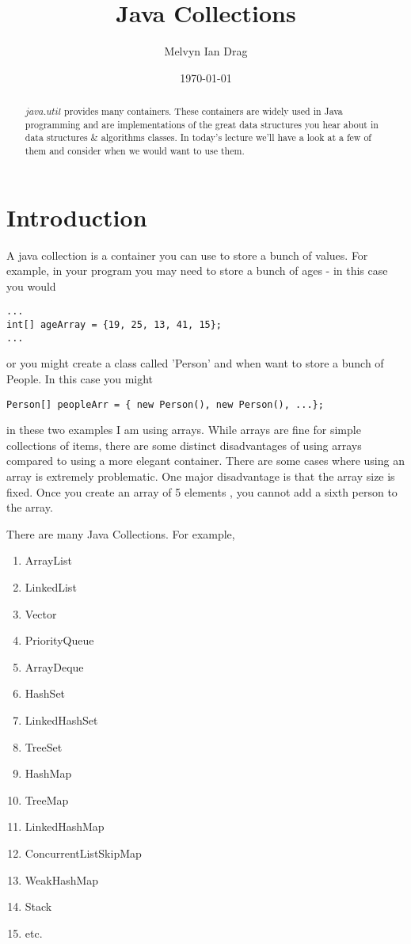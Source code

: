 \documentclass[12pt]{article}
\title{Java Collections}
\author{
	Melvyn Ian Drag
}
\date{\today}
\begin{document}
\maketitle

\begin{abstract}
$java.util$ provides many containers. These containers are widely used in Java programming and are implementations of the great data structures you hear about in data structures \& algorithms classes. In today's lecture we'll have a look at a few of them and consider when we would want to use them.
\end{abstract}

\section{Introduction}
A java collection is a container you can use to store a bunch of values. For example, in your program you may need to store a bunch of ages - in this case you would

\begin{lstlisting}
...
int[] ageArray = {19, 25, 13, 41, 15};
...
\end{lstlisting} 

or you might create a class called 'Person' and when want to store a bunch of People. In this case you might

\begin{lstlisting}
Person[] peopleArr = { new Person(), new Person(), ...};
\end{lstlisting}

in these two examples I am using arrays. While arrays are fine for simple collections of items, there are some distinct disadvantages of using arrays compared to using a more elegant container. There are some cases where using an array is extremely problematic. One major disadvantage is that the array size is fixed. Once you create an array of 5  elements , you cannot add a sixth person to the array.  

There are many Java Collections. For example, 

\begin{enumerate}
\item ArrayList
\item LinkedList
\item Vector
\item PriorityQueue
\item ArrayDeque
\item HashSet
\item LinkedHashSet
\item TreeSet
\item HashMap
\item TreeMap
\item LinkedHashMap
\item ConcurrentListSkipMap
\item WeakHashMap
\item Stack
\item etc.
\end{enumerate}
\end{document}
